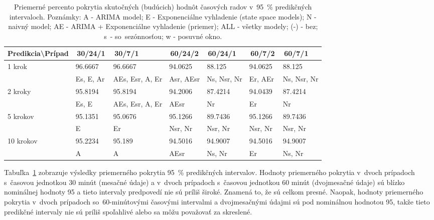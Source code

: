 \documentclass[thesismargins, thesislinespacing, openright, upjsfrontpage]{rnthesis}
\begin{document}
\begin{table}[h]
    \centering
    \footnotesize 
    \singlespacing 
    \begin{tabular}{|p{3cm}|p{1.5cm}|p{1.5cm}|p{1.5cm}|p{1.5cm}|p{1.5cm}|p{1.5cm}|} \hline
        Predikcia\textbackslash Prípad & \,30/24/1\, & \,30/7/1\, & \,60/24/2\, & \,60/24/1\, & \,60/7/2\, & \,60/7/1\, \\
     \hline\hline
        \multirow{2}{*}{1 krok} & 96.6667 & 96.6667 & 94.0625 & 88.125 & 94.0625 & 88.125 \\
        & Es, E, Ar & AEs, Esr, A, Er & Asr, AEsr & Ns, Nsr, Nr & Er, AEr & Ns, Nsr, Nr  \\
        \hline
        \multirow{2}{*}{2 kroky} & 95.8194 & 95.8194 & 94.2006 & 87.4214 & 94.0439 & 87.4214 \\
        & Es, E & AEs, Esr, A, Er & AEsr & Nr & Er & Nr \\
        \hline
        \multirow{2}{*}{5 krokov} & 95.1351 & 95.0676 & 95.1266 & 89.7436 & 95.1266 & 89.7436 \\
        & E & Er & Nsr, Nr & Nsr, Nr & Nsr, Nr & Nsr, Nr  \\
        \hline
        \multirow{2}{*}{10 krokov} & 95.2234 & 95.189 & 94.5016 & 94.9007 & 94.5016 & 94.9007 \\
        & A & A & AEsr & Ns, Nr & Er & Ns, Nr \\
        \hline
    \end{tabular}
    \caption{Priemerné percento pokrytia skutočných (budúcich) hodnôt časových radov v~95~\% predikčných intervaloch. Poznámky: A - ARIMA model; E - Exponenciálne vyhladenie (state space models); N - naivný model; AE - ARIMA + Exponenciálne vyhladenie (priemer); ALL - všetky modely; (-) - bez; s~- so~sezónnosťou; w - posuvné okno.}
    \label{tab:avg_95}
\end{table}

Tabuľka~\ref{tab:avg_95} zobrazuje výsledky priemerného pokrytia 95~\% predikčných intervalov. Hodnoty priemerného pokrytia v~dvoch prípadoch s~časovou jednotkou 30 minút (mesačné údaje) a v~dvoch prípadoch s~časovou jednotkou 60 minút (dvojmesačné údaje) sú blízko nominálnej hodnoty 95 a tieto intervaly predpovedí nie sú príliš široké. Znamená to, že sú celkom presné. Naopak, hodnoty priemerného pokrytia v~dvoch prípadoch so~60-minútovými časovými intervalmi a dvojmesačnými údajmi sú pod nominálnou hodnotou 95, takže tieto predikčné intervaly nie sú príliš spoľahlivé alebo sa môžu považovať za skreslené.
\end{document}
